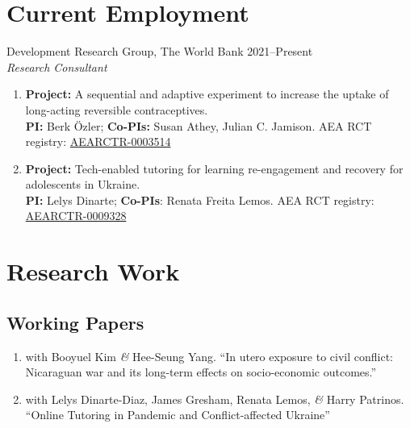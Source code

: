 \documentclass[a4paper, 10pt]{article}
\renewenvironment{itemize}{
  \begin{list}{}
    { \setlength{\itemsep}{5pt}
      \setlength{\parsep}{0pt}
      \setlength{\topsep}{0pt}
      \setlength{\leftmargin}{0em} } }{
  \end{list}}
\begin{document}
\section*{Current Employment}
\begin{itemize}
\item Development Research Group, The World Bank \hfill 2021--Present \\
{\small \textit{Research Consultant} }
  \begin{enumerate}[leftmargin=10pt, label={}, nosep]
    \item {\small \textbf{Project:} A sequential and adaptive experiment to increase the uptake of long-acting reversible contraceptives.} \\ {\small \textbf{PI:} Berk Özler; \textbf{Co-PIs:} Susan Athey, Julian C. Jamison.} {\small AEA RCT registry: \href{https://www.socialscienceregistry.org/trials/3514}{AEARCTR-0003514}}
    \item {\small \textbf{Project:} Tech-enabled tutoring for learning re-engagement and recovery for adolescents in Ukraine.} \\ {\small \textbf{PI:} Lelys Dinarte; \textbf{Co-PIs}: Renata Freita Lemos.} {\small AEA RCT registry: \href{https://www.socialscienceregistry.org/trials/9328}{AEARCTR-0009328}}
  \end{enumerate}  
\end{itemize}





\section*{Research Work}

\subsection*{Working Papers}

\begin{enumerate}[leftmargin=10pt, label={}, itemindent=-10pt, nosep]
\item with Booyuel Kim \textit{\&} Hee-Seung Yang. ``In utero exposure to civil conflict: Nicaraguan war and its long-term effects on socio-economic outcomes.''
\item with Lelys Dinarte-Diaz, James Gresham, Renata Lemos, \textit{\&} Harry
Patrinos. ``Online Tutoring in Pandemic and Conflict-affected Ukraine''
\end{enumerate}
\end{document}
